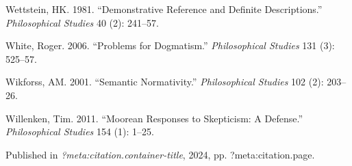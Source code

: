 \documentclass[
  10pt,
  letterpaper,
  DIV=11,
  numbers=noendperiod,
  twoside]{scrartcl}
\newlength{\cslhangindent}
\newenvironment{CSLReferences}[2] %
 {\begin{list}{}{%
  \setlength{\itemindent}{0pt}
  \setlength{\leftmargin}{0pt}
  \setlength{\parsep}{0pt}
  \ifodd #1
   \setlength{\leftmargin}{\cslhangindent}
   \setlength{\itemindent}{-1\cslhangindent}
  \fi
  \setlength{\itemsep}{#2\baselineskip}}}
 {\end{list}}
\begin{document}
\begin{CSLReferences}{1}{0}
Wettstein, HK. 1981. {``Demonstrative Reference and Definite
Descriptions.''} \emph{Philosophical Studies} 40 (2): 241--57.

White, Roger. 2006. {``Problems for Dogmatism.''} \emph{Philosophical
Studies} 131 (3): 525--57.

Wikforss, AM. 2001. {``Semantic Normativity.''} \emph{Philosophical
Studies} 102 (2): 203--26.

Willenken, Tim. 2011. {``Moorean Responses to Skepticism: A Defense.''}
\emph{Philosophical Studies} 154 (1): 1--25.

\end{CSLReferences}



\noindent Published in\emph{
?meta:citation.container-title}, 2024, pp. ?meta:citation.page.
\end{document}
